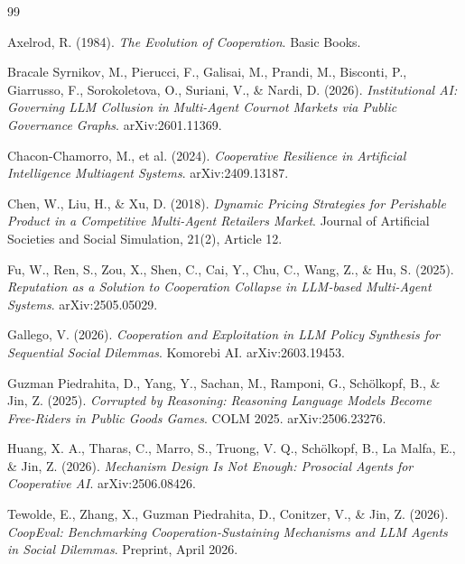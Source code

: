 \documentclass{article}
\begin{document}

\begin{thebibliography}{99}

Axelrod, R. (1984).
\textit{The Evolution of Cooperation}.
Basic Books.

Bracale Syrnikov, M., Pierucci, F., Galisai, M., Prandi, M., Bisconti, P., Giarrusso, F., Sorokoletova, O., Suriani, V., \& Nardi, D. (2026).
\textit{Institutional AI: Governing LLM Collusion in Multi-Agent Cournot Markets via Public Governance Graphs}.
arXiv:2601.11369.

Chacon-Chamorro, M., et al. (2024).
\textit{Cooperative Resilience in Artificial Intelligence Multiagent Systems}.
arXiv:2409.13187.

Chen, W., Liu, H., \& Xu, D. (2018).
\textit{Dynamic Pricing Strategies for Perishable Product in a Competitive Multi-Agent Retailers Market}.
Journal of Artificial Societies and Social Simulation, 21(2), Article 12.

Fu, W., Ren, S., Zou, X., Shen, C., Cai, Y., Chu, C., Wang, Z., \& Hu, S. (2025).
\textit{Reputation as a Solution to Cooperation Collapse in LLM-based Multi-Agent Systems}.
arXiv:2505.05029.

Gallego, V. (2026).
\textit{Cooperation and Exploitation in LLM Policy Synthesis for Sequential Social Dilemmas}.
Komorebi AI. arXiv:2603.19453.

Guzman Piedrahita, D., Yang, Y., Sachan, M., Ramponi, G., Sch\"{o}lkopf, B., \& Jin, Z. (2025).
\textit{Corrupted by Reasoning: Reasoning Language Models Become Free-Riders in Public Goods Games}.
COLM 2025. arXiv:2506.23276.

Huang, X. A., Tharas, C., Marro, S., Truong, V. Q., Sch\"{o}lkopf, B., La Malfa, E., \& Jin, Z. (2026).
\textit{Mechanism Design Is Not Enough: Prosocial Agents for Cooperative AI}.
arXiv:2506.08426.

Tewolde, E., Zhang, X., Guzman Piedrahita, D., Conitzer, V., \& Jin, Z. (2026).
\textit{CoopEval: Benchmarking Cooperation-Sustaining Mechanisms and LLM Agents in Social Dilemmas}.
Preprint, April 2026.

\end{thebibliography}
\end{document}
